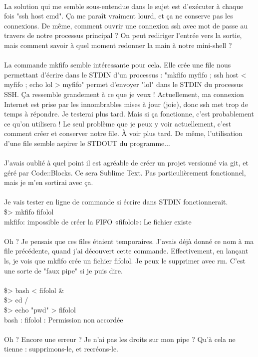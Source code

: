 \\La solution qui me semble sous-entendue dans le sujet est d'exécuter à chaque fois "ssh host cmd". Ça me paraît vraiment lourd, et ça ne conserve pas les connexions. De même, comment ouvrir une connexion ssh avec mot de passe au travers de notre processus principal ? On peut rediriger l'entrée vers la sortie, mais comment savoir à quel moment redonner la main à notre mini-shell ?
\\\\
La commande mkfifo semble intéressante pour cela. Elle crée une file nous permettant d'écrire dans le STDIN d'un processus : "mkfifo myfifo ; ssh host < myfifo ; echo lol > myfifo" permet d'envoyer "lol" dans le STDIN du processus SSH. Ça ressemble grandement à ce que je veux ! Actuellement, ma connexion Internet est prise par les innombrables mises à jour (joie), donc ssh met trop de temps à répondre. Je testerai plus tard. Mais si ça fonctionne, c'est probablement ce qu'on utilisera ! Le seul problème que je peux y voir actuellement, c'est comment créer et conserver notre file. À voir plus tard. De même, l'utilisation d'une file semble aspirer le STDOUT du programme...
\\\\
J'avais oublié à quel point il est agréable de créer un projet versionné via git, et géré par Code::Blocks. Ce sera Sublime Text. Pas particulièrement fonctionnel, mais je m'en sortirai avec ça.
\\\\
Je vais tester en ligne de commande si écrire dans STDIN fonctionnerait.
\\\$> mkfifo fifolol
\\mkfifo: impossible de créer la FIFO «fifolol»: Le fichier existe
\\\\
Oh ? Je pensais que ces files étaient temporaires. J'avais déjà donné ce nom à ma file précédente, quand j'ai découvert cette commande. Effectivement, en lançant ls, je vois que mkfifo crée un fichier fifolol. Je peux le supprimer avec rm. C'est une sorte de "faux pipe" si je puis dire.
\\\\
\$> bash < fifolol \&
\\\$> cd /
\\\$> echo "pwd" > fifolol
\\bash : fifolol : Permission non accordée
\\\\
Oh ? Encore une erreur ? Je n'ai pas les droits sur mon pipe ? Qu'à cela ne tienne : supprimons-le, et recréons-le.
